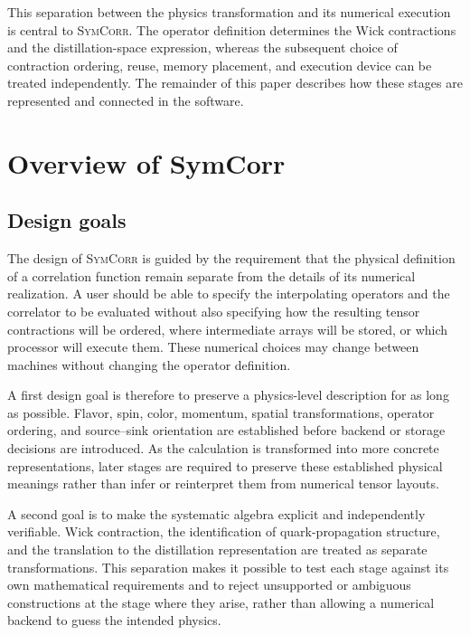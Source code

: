 \documentclass[11pt]{article}
\begin{document}
This separation between the physics transformation and its numerical execution
is central to \textsc{SymCorr}. The operator definition determines the Wick
contractions and the distillation-space expression, whereas the subsequent
choice of contraction ordering, reuse, memory placement, and execution device
can be treated independently. The remainder of this paper describes how these
stages are represented and connected in the software.

\section{Overview of SymCorr}
\label{sec:overview}

\subsection{Design goals}

The design of \textsc{SymCorr} is guided by the requirement that the physical
definition of a correlation function remain separate from the details of its
numerical realization. A user should be able to specify the interpolating
operators and the correlator to be evaluated without also specifying how the
resulting tensor contractions will be ordered, where intermediate arrays will
be stored, or which processor will execute them. These numerical choices may
change between machines without changing the operator definition.

A first design goal is therefore to preserve a physics-level description for as
long as possible. Flavor, spin, color, momentum, spatial transformations,
operator ordering, and source--sink orientation are established before backend
or storage decisions are introduced. As the calculation is transformed into
more concrete representations, later stages are required to preserve these
established physical meanings rather than infer or reinterpret them from
numerical tensor layouts.

A second goal is to make the systematic algebra explicit and independently
verifiable. Wick contraction, the identification of quark-propagation
structure, and the translation to the distillation representation are treated
as separate transformations. This separation makes it possible to test each
stage against its own mathematical requirements and to reject unsupported or
ambiguous constructions at the stage where they arise, rather than allowing a
numerical backend to guess the intended physics.
\end{document}
